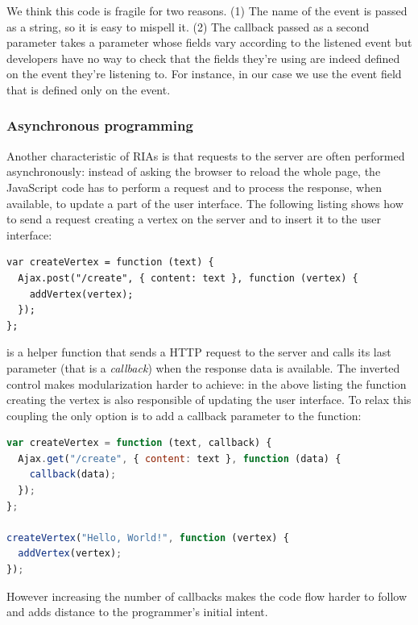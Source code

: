 \documentclass[american,english,runningheads]{llncs}
\begin{document}
We think this code is fragile for two reasons. (1) The name of the event is passed as a string, so it is easy to
mispell it. (2) The callback passed as a second parameter takes a parameter  whose fields vary according to
the listened event but developers have no way to check that the fields they’re using are indeed defined on the event
they’re listening to. For instance, in our case we use the  event field that is defined only on the
 event.

\subsubsection{Asynchronous programming}

Another characteristic of RIAs is that requests to the server are often performed asynchronously: instead of asking
the browser to reload the whole page, the JavaScript code has to perform a request and to process the response, when
available, to update a part of the user interface. The following listing shows how to send a request creating a
vertex on the server and to insert it to the user interface:

\begin{lstlisting}
var createVertex = function (text) {
  Ajax.post("/create", { content: text }, function (vertex) {
    addVertex(vertex);
  });
};
\end{lstlisting}

 is a helper function that sends a HTTP request to the server and calls its last parameter
(that is a \emph{callback}) when the response data is available. The inverted control makes modularization harder to
achieve: in the above listing the function creating the vertex is also responsible of updating the user interface.
To relax this coupling the only option is to add a callback parameter to the  function:

\begin{lstlisting}[language=JavaScript,label=async-js,caption=Callback-driven JavaScript APIs]
var createVertex = function (text, callback) {
  Ajax.get("/create", { content: text }, function (data) {
    callback(data);
  });
};

createVertex("Hello, World!", function (vertex) {
  addVertex(vertex);
});
\end{lstlisting}

However increasing the number of callbacks makes the code flow harder to follow and adds distance to the programmer's
initial intent.
\end{document}

